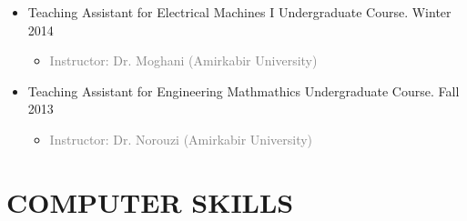 \documentclass[10pt,a4paper,sans]{moderncv} %
\begin{document}
\begin{itemize}
	\item {} Teaching Assistant for Electrical Machines I Undergraduate Course. \hfill Winter 2014
	\begin{itemize} 
		\item \textcolor{gray}{Instructor: Dr. Moghani (Amirkabir University)}
	\end{itemize}
	
	\item {} Teaching Assistant for Engineering Mathmathics Undergraduate Course. \hfill Fall 2013
	\begin{itemize} 
		\item\textcolor{gray}{Instructor: Dr. Norouzi (Amirkabir University)} 
	\end{itemize}

\end{itemize}

\section{COMPUTER SKILLS}
\end{document}
